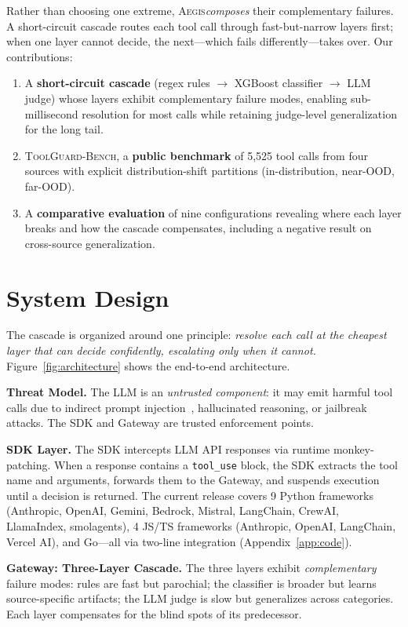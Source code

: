 \documentclass[sigconf]{acmart}
\newcommand{\system}{\textsc{Aegis}\xspace}
\newcommand{\bench}{\textsc{ToolGuard-Bench}\xspace}
\begin{document}
Rather than choosing one extreme, \system \emph{composes} their complementary failures.
A short-circuit cascade routes each tool call through fast-but-narrow layers first; when one layer cannot decide, the next---which fails differently---takes over.
Our contributions:
\begin{enumerate}[nolistsep,leftmargin=*]
\item A \textbf{short-circuit cascade} (regex rules $\to$ XGBoost classifier $\to$ LLM judge) whose layers exhibit complementary failure modes, enabling sub-millisecond resolution for most calls while retaining judge-level generalization for the long tail.
\item \bench, a \textbf{public benchmark} of 5{,}525 tool calls from four sources with explicit distribution-shift partitions (in-distribution, near-OOD, far-OOD).
\item A \textbf{comparative evaluation} of nine configurations revealing where each layer breaks and how the cascade compensates, including a negative result on cross-source generalization.
\end{enumerate}

\section{System Design}
\label{sec:arch}

The cascade is organized around one principle: \emph{resolve each call at the cheapest layer that can decide confidently, escalating only when it cannot.}
Figure~\ref{fig:architecture} shows the end-to-end architecture.

\noindent\textbf{Threat Model.}
The LLM is an \emph{untrusted component}: it may emit harmful tool calls due to indirect prompt injection~\cite{greshake2023not}, hallucinated reasoning, or jailbreak attacks. The SDK and Gateway are trusted enforcement points.

\noindent\textbf{SDK Layer.}
The SDK intercepts LLM API responses via runtime monkey-patching. When a response contains a \texttt{tool\_use} block, the SDK extracts the tool name and arguments, forwards them to the Gateway, and suspends execution until a decision is returned.
The current release covers 9 Python frameworks (Anthropic, OpenAI, Gemini, Bedrock, Mistral, LangChain, CrewAI, LlamaIndex, smolagents), 4 JS/TS frameworks (Anthropic, OpenAI, LangChain, Vercel AI), and Go---all via two-line integration (Appendix~\ref{app:code}).

\noindent\textbf{Gateway: Three-Layer Cascade.}
The three layers exhibit \emph{complementary} failure modes: rules are fast but parochial; the classifier is broader but learns source-specific artifacts; the LLM judge is slow but generalizes across categories.
Each layer compensates for the blind spots of its predecessor.
\end{document}
